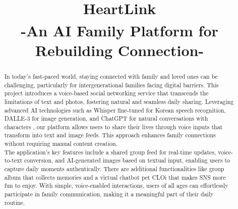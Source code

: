 \documentclass[conference]{IEEEtran}
\begin{document}
\title{HeartLink \\
    {\textsuperscript{}-An AI Family Platform for Rebuilding Connection-}
    }

\author{
\and
{}
\and
{}
\and
{}
}

\maketitle

\begin{abstract}
In today's fast-paced world, staying connected with family and loved ones can be challenging, particularly for intergenerational families facing digital barriers. This project introduces a voice-based social networking service that transcends the limitations of text and photos, fostering natural and seamless daily sharing. Leveraging advanced AI technologies such as Whisper fine-tuned for Korean speech recognition, DALLE-3 for image generation, and ChatGPT for natural conversations with characters , our platform allows users to share their lives through voice inputs that transform into text and image feeds. This approach enhances family connections without requiring manual content creation.\\

The application's key features include a shared group feed for real-time updates, voice-to-text conversion, and AI-generated images based on textual input, enabling users to capture daily moments authentically. There are additional functionalities like group album that collects memories and a virtual chatbot pet CLOi that makes SNS more fun to enjoy. With simple, voice-enabled interactions, users of all ages can effortlessly participate in family communication, making it a meaningful part of their daily routine.
\end{abstract}
\end{document}
